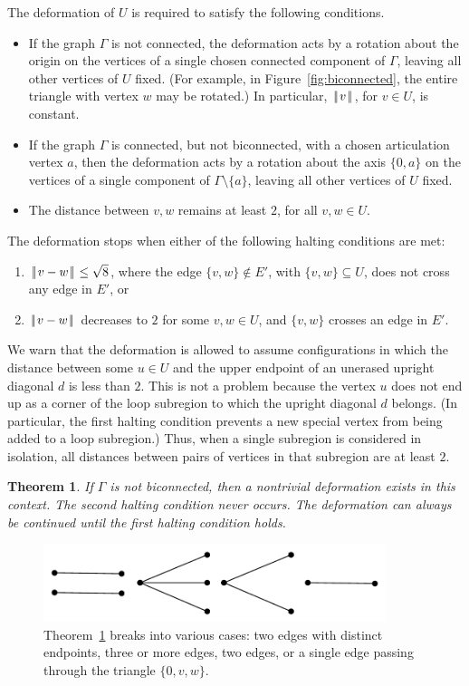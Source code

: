 \documentclass[11pt]{amsart}
\def\|{{\hskip0.1em|\hskip-0.15em|\hskip0.1em}}
\let\subset=\subseteq
\newtheorem{thm}{Theorem}
\begin{document}
The deformation of $U$ is required to satisfy the following conditions.
\begin{itemize}
\item If the graph $\Gamma$ is not connected,
the deformation acts by a rotation about the origin 
on the vertices of a single chosen connected component of $\Gamma$,
leaving all other vertices of $U$ fixed.  (For example, in Figure~\ref{fig:biconnected}, the entire triangle with vertex $w$ may be rotated.)  In particular,
$\|v\|$, for $v\in U$, is constant.
\item If the graph $\Gamma$ is connected, but not biconnected, with a chosen articulation vertex $a$, then
the deformation acts by a rotation about the axis $\{0,a\}$ on the vertices of a single component of $\Gamma\setminus\{a\}$,
leaving all other vertices of $U$ fixed.
\item The distance between $v,w$ remains at least $2$, for all $v,w\in U$.
\end{itemize}

The deformation stops when either of the following halting conditions are met:
\begin{enumerate}
\item $\|v-w\|\le\sqrt8$, where the edge $\{v,w\}\not\in E'$, with $\{v,w\}\subset U$, does not cross any edge in $E'$, or
\item $\|v-w\|$ decreases to $2$ for some $v,w\in U$, and $\{v,w\}$ crosses an edge in $E'$.
\end{enumerate}

We warn that the deformation is allowed to assume configurations in which the distance between some $u\in U$ and the upper endpoint of an unerased upright diagonal $d$ is less than $2$.  This is not a problem because the vertex $u$ does not end up as a corner of the loop subregion to which the upright diagonal $d$ belongs.  (In particular, the first halting condition prevents a new special vertex from being added to a loop subregion.) Thus, when a single subregion is considered in isolation, all distances between pairs of vertices in that subregion are at least $2$.

\begin{thm}\label{thm:biconnected}  
If $\Gamma$ is not biconnected, then a nontrivial deformation exists in this context. 
The second halting condition never occurs.  The deformation can always be continued until the first halting
condition holds.
\end{thm}

\begin{figure}
\begin{center}
\includegraphics[width=10cm]{cases}
\end{center}
\caption{Theorem~\ref{thm:biconnected} breaks into various cases: two edges with
distinct endpoints, three or more edges, two edges, or a single edge
passing through the triangle $\{0,v,w\}$.}
\label{fig:cases}
\end{figure}
\end{document}
